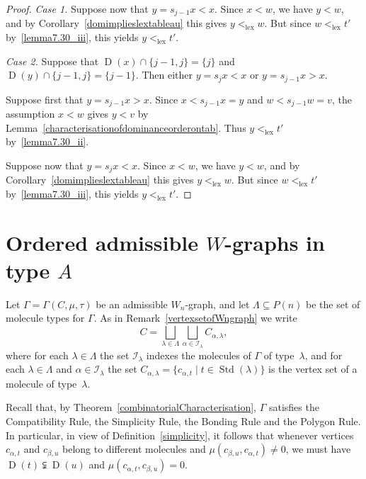\documentclass[10pt]{amsart}
\theoremstyle{definition}
\newenvironment{Case}[1]{\smallskip\noindent\emph{Case #1}\endgraf
 \nobreak\noindent\ignorespaces}{\endgraf\smallskip}
\DeclareMathOperator{\lex}{lex}
\DeclareMathOperator{\STD}{Std}
\DeclareMathOperator{\D}{D}
\begin{document}
\begin{proof}
\begin{Case}{1.}
Suppose now that $y=s_{j-1}x<x$. Since $x<w$, we have $y<w$,
and by Corollary~\ref{domimplieslextableau} this gives $y<_{\lex}w$.
But since $w<_{\lex}t'$ by~\ref{lemma7.30_iii}, this yields $y<_{\lex}t'$.
\end{Case}

\begin{Case}{2.} Suppose that $\D(x)\cap\{j-1,j\}=\{j\}$ and $\D(y)\cap\{j-1,j\}=\{j-1\}$.
Then either $y=s_jx<x$ or $y=s_{j-1}x>x$.

Suppose first that $y=s_{j-1}x>x$. Since $x<s_{j-1}x=y$ and $w<s_{j-1}w=v$, the assumption
$x<w$ gives $y<v$ by Lemma~\ref{characterisationofdominanceorderontab}. Thus
$y<_{\lex}t'$ by~\ref{lemma7.30_ii}.

Suppose now that $y=s_jx<x$. Since $x<w$, we have $y<w$, and by
Corollary~\ref{domimplieslextableau} this gives $y<_{\lex}w$. But since
$w<_{\lex}t'$ by~\ref{lemma7.30_iii}, this yields $y<_{\lex}t'$.\qedhere
\end{Case}
\end{proof}

\section{Ordered admissible \texorpdfstring{$W$}{W}-graphs in type \texorpdfstring{$A$}{A}}
\label{sec:8ex}

Let $\Gamma=\Gamma(C,\mu,\tau)$ be an admissible $W_n$-graph, and let
$\Lambda\subseteq P(n)$ be the set of molecule types for $\Gamma$. As in
Remark~\ref{vertexsetofWngraph} we write
\begin{equation*}
C=\bigsqcup_{\lambda\in\Lambda}\bigsqcup_{\alpha\in\mathcal{I}_{\lambda}}C_{\alpha,\lambda},
\end{equation*}
where for each $\lambda\in\Lambda$ the set $\mathcal{I}_{\lambda}$ indexes
the molecules of $\Gamma$ of type~$\lambda$, and for each $\lambda\in\Lambda$
and $\alpha\in\mathcal{I}_{\lambda}$ the set
$C_{\alpha,\lambda}=\{c_{\alpha,t}\mid t\in\STD(\lambda)\}$ is the vertex
set of a molecule of type~$\lambda$.

Recall that, by Theorem~\ref{combinatorialCharacterisation}, $\Gamma$ satisfies the
Compatibility Rule, the Simplicity Rule,
the Bonding Rule and the Polygon Rule.
In particular,
in view of Definition~\ref{simplicity}, it follows that whenever vertices $c_{\alpha,t}$
and $c_{\beta,u}$ belong to different molecules and
$\mu(c_{\beta,u},c_{\alpha,t})\neq 0$, we must have $\D(t)\subsetneqq\D(u)$ and
$\mu(c_{\alpha,t},c_{\beta,u})=0$.
\end{document}
